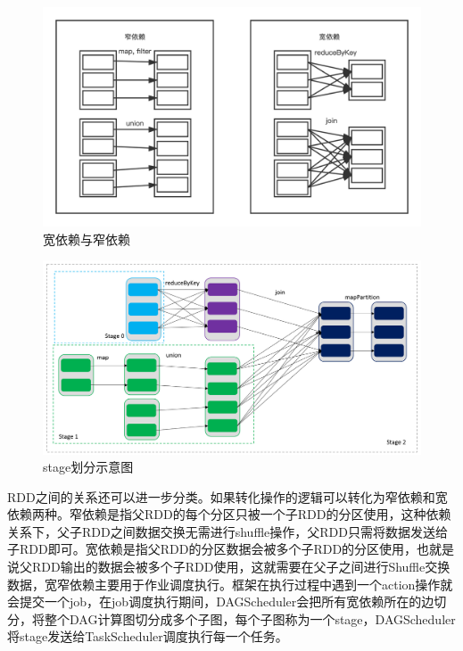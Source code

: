\begin{figure}[htbp]
    \centering
    \includegraphics[width=1\textwidth]{Img/宽窄依赖.png}
    \caption{宽依赖与窄依赖}
    \label{fig:rdd-dependency}
\end{figure}


\begin{figure}[htbp]
    \centering
    \includegraphics[width=1\textwidth]{Img/rdd-dag.png}
    \caption{stage划分示意图}
    \label{fig:rdd-dag-stage}
\end{figure}

RDD之间的关系还可以进一步分类。如果转化操作的逻辑可以转化为窄依赖和宽依赖两种。窄依赖是指父RDD的每个分区只被一个子RDD的分区使用，这种依赖关系下，父子RDD之间数据交换无需进行shuffle操作，父RDD只需将数据发送给子RDD即可。宽依赖是指父RDD的分区数据会被多个子RDD的分区使用，也就是说父RDD输出的数据会被多个子RDD使用，这就需要在父子之间进行Shuffle交换数据，宽窄依赖主要用于作业调度执行。框架在执行过程中遇到一个action操作就会提交一个job，在job调度执行期间，DAGScheduler会把所有宽依赖所在的边切分，将整个DAG计算图切分成多个子图，每个子图称为一个stage，DAGScheduler将stage发送给TaskScheduler调度执行每一个任务。

